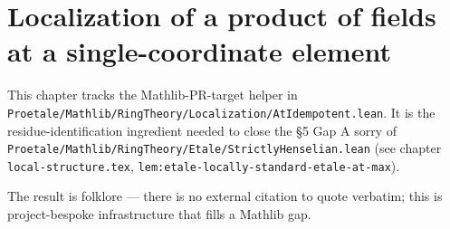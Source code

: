 \chapter{Localization of a product of fields at a single-coordinate element}
\label{chap:Mathlib_RingTheory_Localization_AtIdempotent}

This chapter tracks the Mathlib-PR-target helper
in \texttt{Proetale/Mathlib/RingTheory/Localization/AtIdempotent.lean}.
It is the residue-identification ingredient needed to close the §5 Gap A
sorry of
\texttt{Proetale/Mathlib/RingTheory/Etale/StrictlyHenselian.lean}
(see chapter \texttt{local-structure.tex},
\texttt{lem:etale-locally-standard-etale-at-max}).

The result is folklore --- there is no external citation to quote
verbatim; this is project-bespoke infrastructure that fills a Mathlib
gap.


